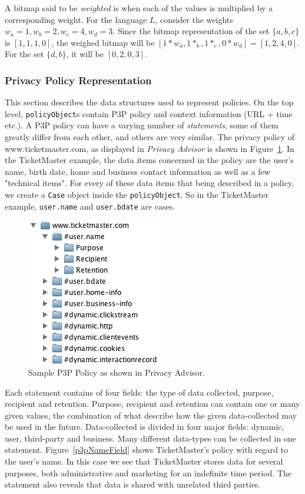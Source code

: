 A bitmap said to be \emph{weighted} is when each of the values is multiplied by a corresponding weight. For the language $L$, consider the weights $w_a=1, w_b=2, w_c=4, w_d=3$. Since the bitmap representation of the set $\{a,b,c\}$ is $[1, 1, 1, 0]$, the weighed bitmap will be $[1*w_a, 1*_b, 1*_c, 0*w_d]=[1, 2, 4, 0]$. For the set $\{d,b\}$, it will be $[0, 2, 0, 3]$.


\subsubsection{Privacy Policy Representation}\label{privPolRep}

This section describes the data structures used to represent policies. On the top level, \texttt{policyObject}s contain P3P policy and context information (URL + time etc.). A P3P policy can have a varying number of \emph{statements}, some of them greatly differ from each other, and others are very similar. The privacy policy of www.ticketmaster.com, as displayed in \emph{Privacy Advisor} is shown in Figure~\ref{p3pPol}. In the TicketMaster example, the data items concerned in the policy are the user's name, birth date, home and business contact information as well as a few "technical items". For every of these data items that being described in a policy, we create a \texttt{Case} object inside the \texttt{policyObject}. So in the TicketMaster example, \texttt{user.name} and \texttt{user.bdate} are cases.

\begin{figure}[htbp]
\begin{center}
\includegraphics{Implementation/p3p_pol}
\caption{Sample P3P Policy as shown in Privacy Advisor.}
\label{p3pPol}
\end{center}
\end{figure}

Each statement contains of four fields: the type of data collected, purpose, recipient and retention. Purpose, recipient and retention can contain one or many given values, the combination of what describe how the given data-collected may be used in the future. Data-collected is divided in four major fields: dynamic, user, third-party and business. Many different data-types can be collected in one statement. Figure~\ref{p3pNameField} shows TicketMaster's policy with regard to the user's name. In this case we see that TicketMaster stores data for several purposes, both administrative and marketing for an indefinite time period. The statement also reveals that data is shared with unrelated third parties.

